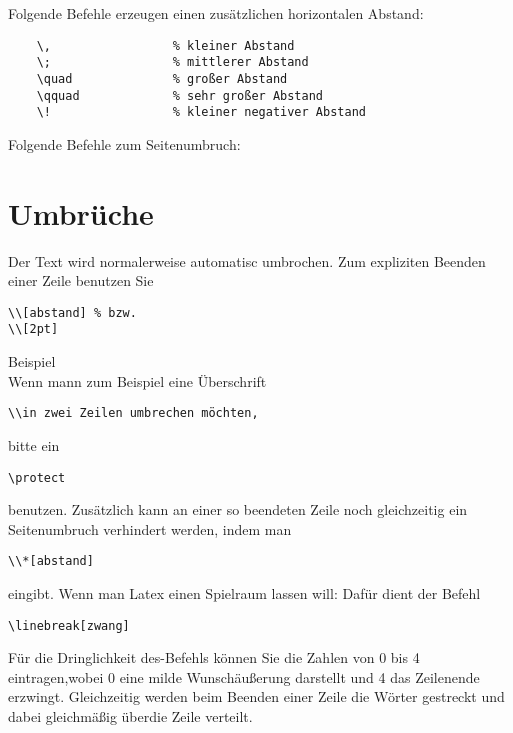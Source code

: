 \documentclass{like}
\begin{document}
Folgende Befehle erzeugen einen zusätzlichen horizontalen Abstand:\nopagebreak\par\medskip\nopagebreak

\qquad\begin{minipage}{0.8\textwidth}
	\begin{verbatim}
	\,                 % kleiner Abstand
	\;                 % mittlerer Abstand
	\quad              % großer Abstand
	\qquad             % sehr großer Abstand
	\!                 % kleiner negativer Abstand
	\end{verbatim}
\end{minipage}\par\bigskip


Folgende Befehle zum Seitenumbruch:\nopagebreak\par\medskip\nopagebreak



\section{Umbrüche}
Der Text wird normalerweise automatisc umbrochen. Zum expliziten Beenden einer Zeile benutzen Sie
\begin{verbatim}
\\[abstand] % bzw.
\\[2pt]
\end{verbatim}
Beispiel\\[4pt]
Wenn mann zum Beispiel eine Überschrift
\begin{verbatim}
\\in zwei Zeilen umbrechen möchten,
\end{verbatim}
bitte ein
\begin{verbatim}
\protect
\end{verbatim}
benutzen. Zusätzlich kann an einer so beendeten Zeile noch gleichzeitig ein Seitenumbruch verhindert werden,
indem man
\begin{verbatim}
\\*[abstand]
\end{verbatim}
eingibt.
Wenn man Latex einen Spielraum lassen will: Dafür dient der Befehl
\begin{verbatim}
\linebreak[zwang]
\end{verbatim}

Für die Dringlichkeit des-Befehls können Sie die Zahlen von 0 bis 4 eintragen,wobei 0 eine milde Wunschäußerung darstellt und 4 das Zeilenende erzwingt. Gleichzeitig werden beim Beenden einer Zeile die Wörter gestreckt und dabei gleichmäßig überdie Zeile verteilt.
\end{document}
